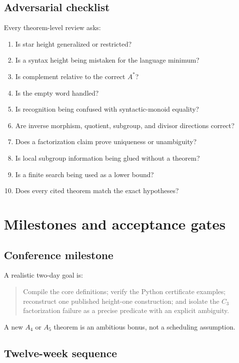 \documentclass{amsart}
\begin{document}
\subsection{Adversarial checklist}

Every theorem-level review asks:
\begin{enumerate}
  \item Is star height generalized or restricted?
  \item Is a syntax height being mistaken for the language minimum?
  \item Is complement relative to the correct $A^\ast$?
  \item Is the empty word handled?
  \item Is recognition being confused with syntactic-monoid equality?
  \item Are inverse morphism, quotient, subgroup, and divisor directions correct?
  \item Does a factorization claim prove uniqueness or unambiguity?
  \item Is local subgroup information being glued without a theorem?
  \item Is a finite search being used as a lower bound?
  \item Does every cited theorem match the exact hypotheses?
\end{enumerate}

\section{Milestones and acceptance gates}

\subsection{Conference milestone}

A realistic two-day goal is:
\begin{quote}
Compile the core definitions; verify the Python certificate examples; reconstruct one published height-one construction; and isolate the $C_3$ factorization failure as a precise predicate with an explicit ambiguity.
\end{quote}
A new $A_4$ or $A_5$ theorem is an ambitious bonus, not a scheduling assumption.

\subsection{Twelve-week sequence}
\end{document}
